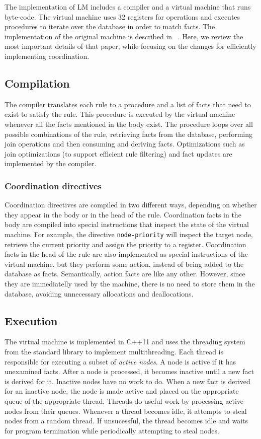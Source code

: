 The implementation of LM includes a compiler and a virtual machine that runs
byte-code. The virtual machine uses 32 registers for
operations and executes procedures to iterate over the database in order to match facts.
The implementation of the original machine is described in ~\cite{cruz-ppdp14}.
Here, we review the most important details of that paper, while focusing on the
changes for efficiently implementing coordination.

\subsection{Compilation}

The compiler translates each rule to a procedure and a list of facts that need
to exist to satisfy the rule. This procedure is executed by the virtual
machine whenever all the facts mentioned in the body exist.
The procedure loops over all possible combinations of the rule, retrieving facts from the
database, performing join operations and then consuming and deriving facts.
Optimizations such as join optimizations (to support efficient rule filtering)
and fact updates are implemented by the compiler.

\subsubsection{Coordination directives}

Coordination directives are compiled in two different ways, depending on whether they
appear in the body or in the head of the rule. Coordination facts in the body
are compiled into special instructions that inspect the state of the virtual
machine. For example, the directive \texttt{node-priority} will inspect the
target node, retrieve the current priority and assign the priority to a
register. Coordination facts in the head of the rule are also implemented as
special instructions of the virtual machine, but they perform some action,
instead of being added to the database as facts.
Semantically, action facts are like any other. However, since they are
immediatelly used by the machine, there is no need to store them in the
database, avoiding unnecessary allocations and deallocations.

\subsection{Execution}

The virtual machine is implemented in C++11 and uses the threading system from
the standard library to implement multithreading. Each thread is responsible for
executing a subset of \emph{active nodes}. A node is active if it has unexamined
facts. After a node is processed, it becomes inactive until a new fact is
derived for it. Inactive nodes have no work to do. When a new fact is derived for an
inactive node, the node is made active and placed on the appropriate queue of
the appropriate thread.  Threads do useful work by processing active nodes from their queues. Whenever a
thread becomes idle, it attempts to steal nodes from a random thread.
If unsucessful, the thread becomes idle and waits for program
termination while periodically attempting to steal nodes.

